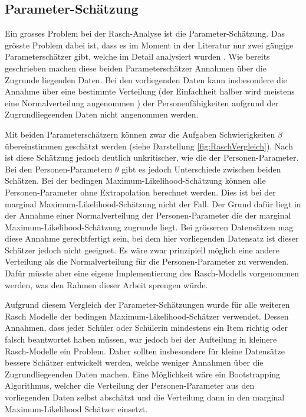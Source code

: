 \subsection{Parameter-Schätzung}

Ein grosses Problem bei der Rasch-Analyse ist die Parameter-Schätzung. Das grösste Problem dabei ist, dass es im Moment in der Literatur nur zwei gängige Parameterschätzer gibt, welche im Detail analysiert wurden \citep{Fischer1995,Rost2004, Strobl2012}. Wie bereits geschrieben machen diese beiden Parameterschätzer Annahmen über die Zugrunde liegenden Daten. Bei den vorliegenden Daten kann insbesondere die Annahme über eine bestimmte Verteilung (der Einfachheit halber wird meistens eine Normalverteilung angenommen \citep{Rost2004}) der Personenfähigkeiten aufgrund der Zugrundliegeenden Daten nicht angenommen werden.

Mit beiden Parameterschätzern können zwar die Aufgaben Schwierigkeiten $\beta$ übereinstimmen geschätzt werden (siehe Darstellung \ref{fig:RaschVergleich}). Nach \citet{Rost2004} ist diese Schätzung jedoch deutlich unkritischer, wie die der Personen-Parameter. Bei den Personen-Parametern $\theta$ gibt es jedoch Unterschiede zwischen beiden Schätzen. Bei der bedingen Maximum-Likelihood-Schätzung können alle Personen-Parameter ohne Extrapolation berechnet werden. Dies ist bei der marginal Maximum-Likelihood-Schätzung nicht der Fall. Der Grund dafür liegt in der Annahme einer Normalverteilung der Personen-Parameter die der marginal Maximum-Likelihood-Schätzung zugrunde liegt. Bei grösseren Datensätzen mag diese Annahme gerechtfertigt sein, bei dem hier vorliegenden Datensatz ist dieser Schätzer jedoch nicht geeignet. Es wäre zwar prinzipiell möglich eine andere Verteilung als die Normalverteilung für die Personen-Parameter zu verwenden. Dafür müsste aber eine eigene Implementierung des Rasch-Modells vorgenommen werden, was den Rahmen dieser Arbeit sprengen würde.

Aufgrund diesem Vergleich der Parameter-Schätzungen wurde für alle weiteren Rasch Modelle der bedingen Maximum-Likelihood-Schätzer verwendet. Dessen Annahmen, dass jeder Schüler oder Schülerin mindestens ein Item richtig oder falsch beantwortet haben müssen, war jedoch bei der Aufteilung in kleinere Rasch-Modelle ein Problem. Daher sollten insbesondere für kleine Datensätze bessere Schätzer entwickelt werden, welche weniger Annahmen über die Zugrundliegeenden Daten machen. Eine Möglichkeit wäre ein Bootstrapping Algorithmus, welcher die Verteilung der Personen-Parameter aus den vorliegenden Daten selbst abschätzt und die Verteilung dann in den marginal Maximum-Likelihood Schätzer einsetzt.

